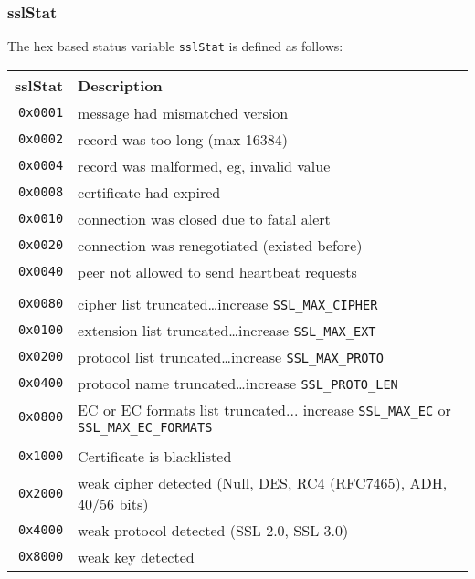 \documentclass[documentation]{subfiles}
\begin{document}
\clearpage

\subsubsection{sslStat}\label{sslStat}
The hex based status variable {\tt sslStat} is defined as follows:
\begin{longtable}{rl}
    \toprule
    {\bf sslStat} & {\bf Description} \\
    \midrule\endhead%
    {\tt 0x0001} & message had mismatched version\\
    {\tt 0x0002} & record was too long (max 16384)\\
    {\tt 0x0004} & record was malformed, eg, invalid value\\
    {\tt 0x0008} & certificate had expired\\
    {\tt 0x0010} & connection was closed due to fatal alert\\
    {\tt 0x0020} & connection was renegotiated (existed before)\\
    {\tt 0x0040} & peer not allowed to send heartbeat requests\\\\

    {\tt 0x0080} & cipher list truncated\ldots increase {\tt SSL\_MAX\_CIPHER}\\
    {\tt 0x0100} & extension list truncated\ldots increase {\tt SSL\_MAX\_EXT}\\
    {\tt 0x0200} & protocol list truncated\ldots increase {\tt SSL\_MAX\_PROTO}\\
    {\tt 0x0400} & protocol name truncated\ldots increase {\tt SSL\_PROTO\_LEN}\\
    {\tt 0x0800} & EC or EC formats list truncated... increase {\tt SSL\_MAX\_EC} or {\tt SSL\_MAX\_EC\_FORMATS}\\\\
    {\tt 0x1000} & Certificate is blacklisted\\
    {\tt 0x2000} & weak cipher detected (Null, DES, RC4 (RFC7465), ADH, 40/56 bits)\\
    {\tt 0x4000} & weak protocol detected (SSL 2.0, SSL 3.0)\\
    {\tt 0x8000} & weak key detected\\
    \bottomrule
\end{longtable}
\end{document}
